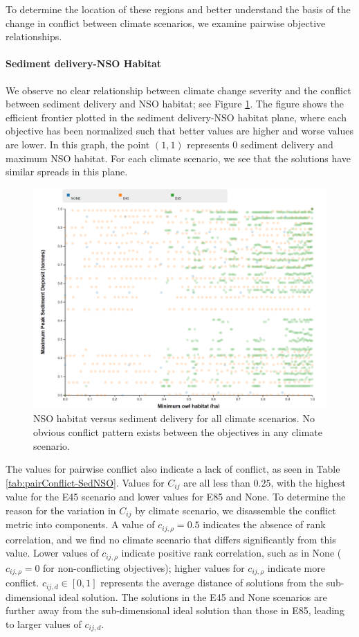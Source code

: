 To determine the location of these regions and better understand the basis of the change in conflict between climate scenarios, we examine pairwise objective relationships.

\paragraph{Sediment delivery-NSO Habitat}
We observe no clear relationship between climate change severity and the conflict between sediment delivery and NSO habitat; see Figure \ref{fig:pairplotNSOSed}. The figure shows the efficient frontier plotted in the sediment delivery-NSO habitat plane, where each objective has been normalized such that better values are higher and worse values are lower. In this graph, the point $(1,1)$ represents 0 sediment delivery and maximum NSO habitat. For each climate scenario, we see that the solutions have similar spreads in this plane.

\begin{figure}[ht]
\centering
\includegraphics[width=.75\textwidth]{../images/2DSlice_NSO_Sed}
\caption[NSO habitat vs. sediment delivery for all climate scenarios]{NSO habitat versus sediment delivery for all climate scenarios. No obvious conflict pattern exists between the objectives in any climate scenario.}
\label{fig:pairplotNSOSed}
\end{figure}

The values for pairwise conflict also indicate a lack of conflict, as seen in Table \ref{tab:pairConflict-SedNSO}. Values for $C_{ij}$ are all less than $0.25$, with the highest value for the E45 scenario and lower values for E85 and None. To determine the reason for the variation in $C_{ij}$ by climate scenario, we disassemble the conflict metric into components. A value of $c_{ij,\rho} = 0.5$ indicates the absence of rank correlation, and we find no climate scenario that differs significantly from this value. Lower values of $c_{ij,\rho}$ indicate positive rank correlation, such as in None ($c_{ij,\rho}=0$ for non-conflicting objectives); higher values for $c_{ij,\rho}$ indicate more conflict. $c_{ij,d} \in [0,1]$ represents the average distance of solutions from the sub-dimensional ideal solution. The solutions in the E45 and None scenarios are further away from the sub-dimensional ideal solution than those in E85, leading to larger values of $c_{ij,d}$.

